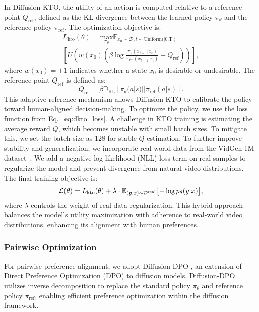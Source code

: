 In Diffusion-KTO, the utility of an action is computed relative to a reference point $Q_{\text{ref}}$, defined as the 
KL divergence between the learned policy $\pi_{\theta}$ and the reference policy $\pi_{\text{ref}}$. The optimization objective is:
\small
\begin{multline}
    L_{\text{kto}}(\theta) = \underset{\pi_{\theta}}{\text{max}} \mathbb{E}_{x_0 \sim \mathcal{D}, t \sim \text{Uniform([0,T])}} \\
    [U(w(x_0)(\beta \log \frac{\pi_\theta(x_{t-1}|x_t)}{\pi_{\text{ref}}(x_{t-1}|x_t)} - Q_{\text{ref}}))],
    \label{eq:dkto_loss}
\end{multline}
\normalsize
where $w(x_0) = \pm1$ indicates whether a state $x_0$ is desirable or undesirable. The reference point $Q_{\text{ref}}$ is defined as:
\small
\begin{equation}
Q_{\text{ref}} = \beta \mathbb{D}_{\text{KL}}[\pi_{\theta}(a|s) || \pi_{\text{ref}}(a|s)].
\end{equation}
\normalsize
This adaptive reference mechanism allows Diffusion-KTO to calibrate the policy toward human-aligned decision-making.
To optimize the policy, we use the loss function from Eq.~\ref{eq:dkto_loss}. A challenge in KTO training is estimating the average reward $Q$, which becomes unstable with small batch sizes. To mitigate this, we set the batch size as 128 for stable $Q$ estimation.
To further improve stability and generalization, we incorporate real-world data from the VidGen-1M dataset~\cite{tan2024vidgen1mlargescaledatasettexttovideo}. We add a negative log-likelihood (NLL) loss term on real samples to regularize the model and prevent divergence from natural video distributions. The final training objective is:
\small
\begin{equation}
\mathcal{L}(\theta) = L_{\text{kto}}(\theta) + \lambda \cdot \mathbb{E}_{(\textbf{\textit{y}}, x) \sim \mathcal{D}^{\mathrm{real}}} \bigl[-\log p_{\theta}(y|x)\bigr],
\end{equation}
\normalsize
where $\lambda$ controls the weight of real data regularization. This hybrid approach balances the model’s utility maximization with adherence to real-world video distributions, enhancing its alignment with human preferences.



\subsubsection{Pairwise Optimization}
For pairwise preference alignment, we adopt Diffusion-DPO \cite{wallace2023diffusionmodelalignmentusing}, an extension of Direct Preference Optimization (DPO) \cite{rafailov2024directpreferenceoptimizationlanguage} to diffusion models. Diffusion-DPO utilizes inverse decomposition to replace the standard policy $\pi_\theta$ and reference policy $\pi_{\text{ref}}$, enabling efficient preference optimization within the diffusion framework.

